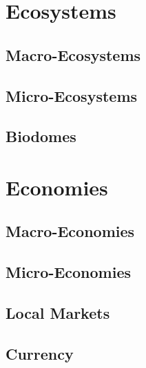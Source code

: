 \section{Ecosystems}\label{sec:ecosystem}
\subsection{Macro-Ecosystems}\label{subsec:macro_eco}

\subsection{Micro-Ecosystems}\label{subsec:micro_eco}

\subsection{Biodomes}\label{subsec:biodomes}

\section{Economies}\label{sec:economy}

\subsection{Macro-Economies}\label{subsec:macro_money}

\subsection{Micro-Economies}\label{subsec:micro_money}

\subsection{Local Markets}\label{subsec:local_marts}

\subsection*{Currency}
